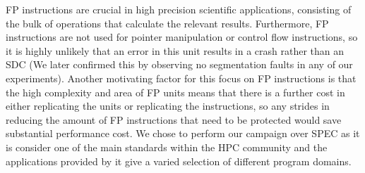 \documentclass[lettersize,journal]{IEEEtran}
\begin{document}
FP instructions are crucial in high precision scientific applications, consisting of the bulk of operations that calculate the relevant results. Furthermore, FP instructions are not used for pointer manipulation or control flow instructions, so it is highly unlikely that an error in this unit results in a crash rather than an SDC (We later confirmed this by observing no segmentation faults in any of our experiments).
Another motivating factor for this focus on FP instructions is that the high complexity and area of FP units means that there is a further cost in either replicating the units or replicating the instructions, so any strides in reducing the amount of FP instructions that need to be protected would save substantial performance cost.
We chose to perform our campaign over SPEC as it is consider one of the main standards within the HPC community and the applications provided by it give a varied selection of different program domains.\\
\end{document}
